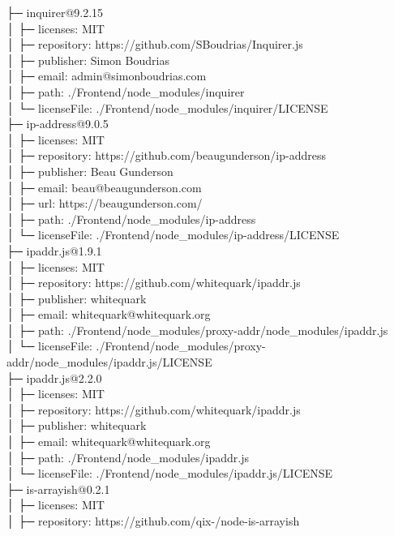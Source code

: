 ├─ inquirer@9.2.15\\
│  ├─ licenses: MIT\\
│  ├─ repository: https://github.com/SBoudrias/Inquirer.js\\
│  ├─ publisher: Simon Boudrias\\
│  ├─ email: admin@simonboudrias.com\\
│  ├─ path: ./Frontend/node\_modules/inquirer\\
│  └─ licenseFile: ./Frontend/node\_modules/inquirer/LICENSE\\
├─ ip-address@9.0.5\\
│  ├─ licenses: MIT\\
│  ├─ repository: https://github.com/beaugunderson/ip-address\\
│  ├─ publisher: Beau Gunderson\\
│  ├─ email: beau@beaugunderson.com\\
│  ├─ url: https://beaugunderson.com/\\
│  ├─ path: ./Frontend/node\_modules/ip-address\\
│  └─ licenseFile: ./Frontend/node\_modules/ip-address/LICENSE\\
├─ ipaddr.js@1.9.1\\
│  ├─ licenses: MIT\\
│  ├─ repository: https://github.com/whitequark/ipaddr.js\\
│  ├─ publisher: whitequark\\
│  ├─ email: whitequark@whitequark.org\\
│  ├─ path: ./Frontend/node\_modules/proxy-addr/node\_modules/ipaddr.js\\
│  └─ licenseFile: ./Frontend/node\_modules/proxy-addr/node\_modules/ipaddr.js/LICENSE\\
├─ ipaddr.js@2.2.0\\
│  ├─ licenses: MIT\\
│  ├─ repository: https://github.com/whitequark/ipaddr.js\\
│  ├─ publisher: whitequark\\
│  ├─ email: whitequark@whitequark.org\\
│  ├─ path: ./Frontend/node\_modules/ipaddr.js\\
│  └─ licenseFile: ./Frontend/node\_modules/ipaddr.js/LICENSE\\
├─ is-arrayish@0.2.1\\
│  ├─ licenses: MIT\\
│  ├─ repository: https://github.com/qix-/node-is-arrayish\\
